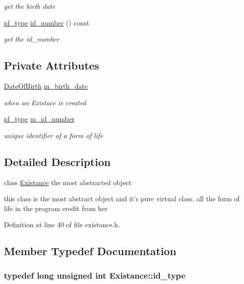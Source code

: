 \begin{DoxyCompactItemize}
\begin{DoxyCompactList}\small\item\em get the birth date \end{DoxyCompactList}\item 
\hypertarget{classExistance_ad8b3c9cfa5c5be0f1420b4e43e78e227}{
\hyperlink{classExistance_a82c4092964457cd7da30d53072c62f1a}{id\_\-type} \hyperlink{classExistance_ad8b3c9cfa5c5be0f1420b4e43e78e227}{id\_\-number} () const }
\label{classExistance_ad8b3c9cfa5c5be0f1420b4e43e78e227}

\begin{DoxyCompactList}\small\item\em get the id\_\-number \end{DoxyCompactList}\end{DoxyCompactItemize}
\subsection*{Private Attributes}
\begin{DoxyCompactItemize}
\item 
\hyperlink{classDateOfBirth}{DateOfBirth} \hyperlink{classExistance_aee261695e56ed7a8d1d72aea3beb8fae}{m\_\-birth\_\-date}
\begin{DoxyCompactList}\small\item\em when an Existace is created \end{DoxyCompactList}\item 
\hyperlink{classExistance_a82c4092964457cd7da30d53072c62f1a}{id\_\-type} \hyperlink{classExistance_a6efaefb1b86cde1108adb1e71f33f84f}{m\_\-id\_\-number}
\begin{DoxyCompactList}\small\item\em unique identifier of a form of life \end{DoxyCompactList}\end{DoxyCompactItemize}


\subsection{Detailed Description}
class \hyperlink{classExistance}{Existance} the most abstracted object 

this class is the most abstract object and it's pure virtual class. all the form of life in the program eredit from her 

Definition at line 40 of file existance.h.



\subsection{Member Typedef Documentation}
\hypertarget{classExistance_a82c4092964457cd7da30d53072c62f1a}{
\subsubsection[{id\_\-type}]{\setlength{\rightskip}{0pt plus 5cm}typedef long unsigned int {\bf Existance::id\_\-type}}}
\label{classExistance_a82c4092964457cd7da30d53072c62f1a}


